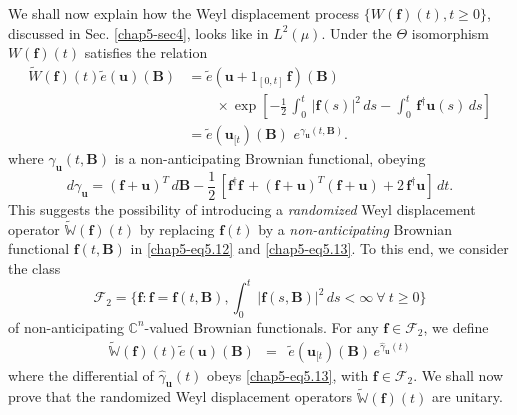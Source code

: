 We shall now explain how the Weyl displacement process $\{W(\mathbf{f})(t), t\geq 0\}$, discussed in Sec. \ref{chap5-sec4}, looks like in $L^2(\mu)$. Under the $\Theta$ isomorphism $W(\mathbf{f})(t)$ satisfies the relation   
\begin{align}
\widetilde{W}(\mathbf{f})(t)\widetilde{e}(\mathbf{u})(\mathbf{B}) &= \widetilde{e}(\mathbf{u}+1_{[0,t]}\, \mathbf{f})(\mathbf{B}) \, \,\nonumber \\ 
& \qquad \times {\exp}\left[-\frac{1}{2}\, \int_0^t\, \vert \mathbf{f}(s)\vert^2\, ds -\int_0^t\, \mathbf{f}^\dag\mathbf{u}(s)\, ds\right] \nonumber \\
&=\widetilde{e}(\mathbf{u}_{[t})(\mathbf{B})\,\, e^{\gamma_{\mathbf{u}}(t,\mathbf{B})}. 
\label{chap5-eq5.12}
\end{align}     
where $\gamma_{\mathbf{u}}(t,\mathbf{B})$ is a non-anticipating Brownian functional, obeying  
\begin{equation} 
d\gamma_{\mathbf{u}}=  (\mathbf{f}+\mathbf{u})^T\, d\mathbf{B}-\frac{1}{2}\,\left[ \mathbf{f}^\dag\mathbf{f}\, +
(\mathbf{f}+\mathbf{u})^T(\mathbf{f}+\mathbf{u})+2\,\mathbf{f}^\dag\mathbf{u} \right]\, dt. \label{chap5-eq5.13}
\end{equation}
This suggests the possibility of introducing a {\it randomized} Weyl displacement operator $\widetilde{\mathbb{W}}(\mathbf{f})(t)$ by replacing $\mathbf{f}(t)$ by a {\it non-anticipating} Brownian functional $\mathbf{f}(t,\mathbf{B})$ in \eqref{chap5-eq5.12} and  \eqref{chap5-eq5.13}. To this end, we consider the class  
$$
\mathcal{F}_2 = \{\mathbf{f}: \mathbf{f}=\mathbf{f}(t,\mathbf{B}), \int_{0}^{t}\, \vert \mathbf{f}(s,\mathbf{B})\vert^2\, ds <\infty \ \forall\ t\geq 0\}
$$  
of non-anticipating  $\mathbb{C}^n$-valued   Brownian functionals.  For any $\mathbf{f}\in \mathcal{F}_2$, we define
\begin{eqnarray}
\widetilde{\mathbb{W}}(\mathbf{f})(t)\widetilde{e}(\mathbf{u})(\mathbf{B})&=&
\widetilde{e}(\mathbf{u}_{[t})(\mathbf{B})\, e^{\hat{\gamma}_\mathbf{u}(t)} \label{chap5-eq5.14}
\end{eqnarray}  
where the differential of $\hat{\gamma}_\mathbf{u}(t)$ obeys  \eqref{chap5-eq5.13}, with $\mathbf{f}\in \mathcal{F}_2$.  We shall now prove that the randomized Weyl displacement operators $\widetilde{\mathbb{W}}(\mathbf{f})(t)$ are unitary.  

